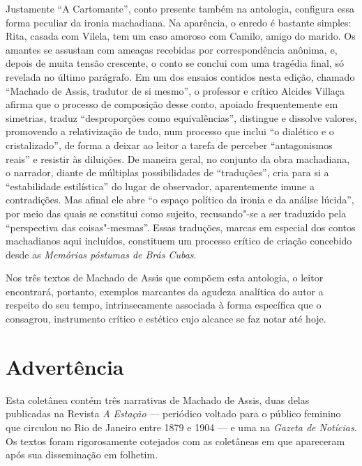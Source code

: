 Justamente ``A Cartomante'', conto presente também na antologia,
configura essa forma peculiar da ironia machadiana. Na aparência, o
enredo é bastante simples: Rita, casada com Vilela, tem um caso amoroso
com Camilo, amigo do marido. Os amantes se assustam com ameaças
recebidas por correspondência anônima, e, depois de muita tensão
crescente, o conto se conclui com uma tragédia final, só revelada no
último parágrafo. Em um dos ensaios contidos nesta edição, chamado
``Machado de Assis, tradutor de si mesmo'', o professor e crítico
Alcides Villaça afirma que o processo de composição desse conto, apoiado
frequentemente em simetrias, traduz ``desproporções como
equivalências'', distingue e dissolve valores, promovendo a
relativização de tudo, num processo que inclui ``o dialético e o
cristalizado'', de forma a deixar ao leitor a tarefa de perceber
``antagonismos reais'' e resistir às diluições. De maneira geral, no
conjunto da obra machadiana, o narrador, diante de múltiplas
possibilidades de ``traduções'', cria para si a ``estabilidade
estilística'' do lugar de observador, aparentemente imune a
contradições. Mas afinal ele abre ``o espaço político da ironia e da
análise lúcida'', por meio das quais se constitui como sujeito,
recusando"-se a ser traduzido pela ``perspectiva das coisas"-mesmas''.
Essas traduções, marcas em especial dos contos machadianos aqui
incluídos, constituem um processo crítico de criação concebido desde as
\emph{Memórias póstumas de Brás Cubas}.

Nos três textos de Machado de Assis que compõem esta antologia, o leitor
encontrará, portanto, exemplos marcantes da agudeza analítica do autor a
respeito do seu tempo, intrinsecamente associada à forma específica que
o consagrou, instrumento crítico e estético cujo alcance se faz notar
até hoje.


\chapter{Advertência}

Esta coletânea contém três narrativas de Machado de Assis, duas delas
publicadas na Revista \emph{A Estação} --- periódico voltado para o
público feminino que circulou no Rio de Janeiro entre 1879 e 1904 --- e
uma na \emph{Gazeta de Notícias}. Os textos foram rigorosamente
cotejados com as coletâneas em que apareceram após sua disseminação em
folhetim.

